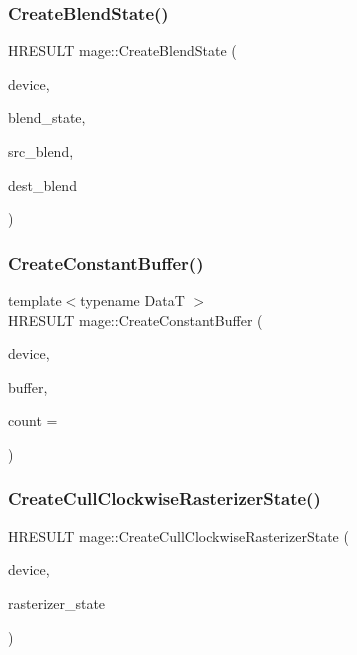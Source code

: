 \hypertarget{namespacemage_ad2c838028ab44521fe1818721dd7ade1}{}\label{namespacemage_ad2c838028ab44521fe1818721dd7ade1} 
\subsubsection{\texorpdfstring{Create\+Blend\+State()}{CreateBlendState()}}
{\footnotesize\ttfamily H\+R\+E\+S\+U\+LT mage\+::\+Create\+Blend\+State (\begin{DoxyParamCaption}\item[{I\+D3\+D11\+Device2 $\ast$}]{device,  }\item[{I\+D3\+D11\+Blend\+State $\ast$$\ast$}]{blend\+\_\+state,  }\item[{D3\+D11\+\_\+\+B\+L\+E\+ND}]{src\+\_\+blend,  }\item[{D3\+D11\+\_\+\+B\+L\+E\+ND}]{dest\+\_\+blend }\end{DoxyParamCaption})}

\hypertarget{namespacemage_a5eed34f604a40811bb0282dff7e6e712}{}\label{namespacemage_a5eed34f604a40811bb0282dff7e6e712} 
\subsubsection{\texorpdfstring{Create\+Constant\+Buffer()}{CreateConstantBuffer()}}
{\footnotesize\ttfamily template$<$typename DataT $>$ \\
H\+R\+E\+S\+U\+LT mage\+::\+Create\+Constant\+Buffer (\begin{DoxyParamCaption}\item[{I\+D3\+D11\+Device2 $\ast$}]{device,  }\item[{I\+D3\+D11\+Buffer $\ast$$\ast$}]{buffer,  }\item[{size\+\_\+t}]{count = {} }\end{DoxyParamCaption})}

\hypertarget{namespacemage_a033a0ae29692c9fc223e532b7487aed5}{}\label{namespacemage_a033a0ae29692c9fc223e532b7487aed5} 
\subsubsection{\texorpdfstring{Create\+Cull\+Clockwise\+Rasterizer\+State()}{CreateCullClockwiseRasterizerState()}}
{\footnotesize\ttfamily H\+R\+E\+S\+U\+LT mage\+::\+Create\+Cull\+Clockwise\+Rasterizer\+State (\begin{DoxyParamCaption}\item[{I\+D3\+D11\+Device2 $\ast$}]{device,  }\item[{I\+D3\+D11\+Rasterizer\+State $\ast$$\ast$}]{rasterizer\+\_\+state }\end{DoxyParamCaption})}

